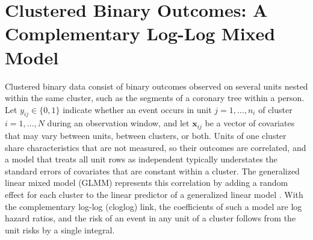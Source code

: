 
\section{Clustered Binary Outcomes: A Complementary Log-Log Mixed Model}
\label{sec:tech-segment-glmm}

Clustered binary data consist of binary outcomes observed on several units nested within the same cluster, such as the segments of a coronary tree within a person.
Let $y_{ij} \in \{0, 1\}$ indicate whether an event occurs in unit $j = 1, \dots, n_i$ of cluster $i = 1, \dots, N$ during an observation window, and let $\mathbf{x}_{ij}$ be a vector of covariates that may vary between units, between clusters, or both.
Units of one cluster share characteristics that are not measured, so their outcomes are correlated, and a model that treats all unit rows as independent typically understates the standard errors of covariates that are constant within a cluster.
The generalized linear mixed model (GLMM) represents this correlation by adding a random effect for each cluster to the linear predictor of a generalized linear model \cite{statacorp2025mecloglog}.
With the complementary log-log (cloglog) link, the coefficients of such a model are log hazard ratios, and the risk of an event in any unit of a cluster follows from the unit risks by a single integral.

